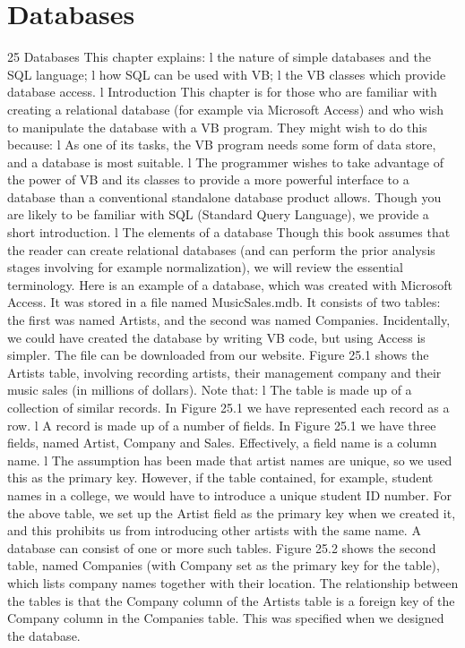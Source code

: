 \chapter{Databases}

25
Databases
This chapter explains:
l	the nature of simple databases and the SQL language;
l	how SQL can be used with VB;
l	the VB classes which provide database access.
l	Introduction
This chapter is for those who are familiar with creating a relational database (for 
example via Microsoft Access) and who wish to manipulate the database with a VB 
program. They might wish to do this because:
l	As one of its tasks, the VB program needs some form of data store, and a database is most suitable.
l	The programmer wishes to take advantage of the power of VB and its classes to provide a more powerful interface to a database than a conventional standalone database product allows.
Though you are likely to be familiar with SQL (Standard Query Language), we provide a short introduction.
l	The elements of a database
Though this book assumes that the reader can create relational databases (and can 
perform the prior analysis stages involving for example normalization), we will review the essential terminology.
Here is an example of a database, which was created with Microsoft Access. It was stored in a ﬁle named MusicSales.mdb. It consists of two tables: the ﬁrst was named Artists, and the second was named Companies. Incidentally, we could have created the database by writing VB code, but using Access is simpler. The ﬁle can be downloaded from our website.
Figure 25.1 shows the Artists table, involving recording artists, their management company and their music sales (in millions of dollars). Note that:
l	The table is made up of a collection of similar records. In Figure 25.1 we have represented each record as a row.
l	A record is made up of a number of ﬁelds. In Figure 25.1 we have three ﬁelds, named Artist, Company and Sales. Effectively, a ﬁeld name is a column name.
l	The assumption has been made that artist names are unique, so we used this as 
the primary key. However, if the table contained, for example, student names in a college, we would have to introduce a unique student ID number. For the above table, we set up the Artist ﬁeld as the primary key when we created it, and this prohibits us from introducing other artists with the same name.
A database can consist of one or more such tables. Figure 25.2 shows the second table, named Companies (with Company set as the primary key for the table), which lists company names together with their location. The relationship between the tables is that the Company column of the Artists table is a foreign key of the Company column in the Companies table. This was speciﬁed when we designed the database.
